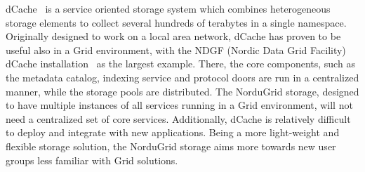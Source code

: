 \documentclass{llncs}
\begin{document}
dCache~\cite{dCache} is a service oriented storage system which combines heterogeneous storage
elements to collect several hundreds of terabytes in a single
namespace. Originally designed to work on a local area network,
dCache has proven to be useful also in a Grid environment, with the
NDGF (Nordic Data Grid Facility) dCache
installation~\cite{DSSWithdCache} as the largest example. There, the
core components, such as the metadata catalog, indexing service and
protocol doors are run in a centralized manner, while the storage
pools are distributed. The
NorduGrid storage, designed to have multiple instances of all
services running in a Grid environment, will not need a centralized
set of core services. Additionally, dCache is relatively difficult to
deploy and integrate with new applications. Being a more light-weight and flexible
storage solution, the NorduGrid storage aims more towards new user
groups less familiar with Grid solutions.
\end{document}
